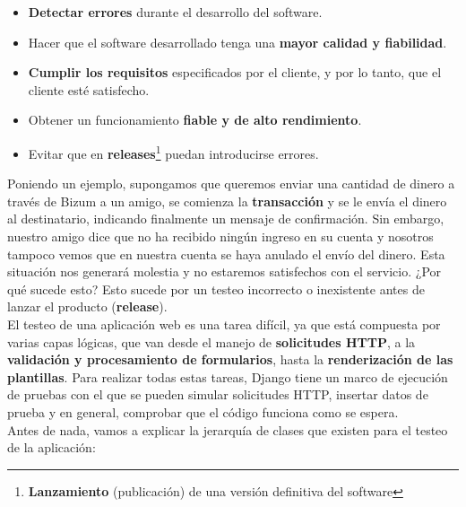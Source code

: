     \begin{itemize}
        \item \textbf{Detectar errores} durante el desarrollo del software.
        \item Hacer que el software desarrollado tenga una \textbf{mayor calidad y
        fiabilidad}.
        \item \textbf{Cumplir los requisitos} especificados por el cliente, y por lo tanto,
        que el cliente esté satisfecho.
        \item Obtener un funcionamiento \textbf{fiable y de alto rendimiento}.
        \item Evitar que en \textbf{releases}\footnote{\textbf{Lanzamiento} (publicación)
        de una versión definitiva del software} puedan introducirse errores.
    \end{itemize}

Poniendo un ejemplo, supongamos que queremos enviar una cantidad de dinero a través de
Bizum a un amigo, se comienza la \textbf{transacción} y se le envía el dinero al
destinatario, indicando finalmente un mensaje de confirmación. Sin embargo, nuestro amigo
dice que no ha recibido ningún ingreso en su cuenta y nosotros tampoco vemos que en nuestra
cuenta se haya anulado el envío del dinero. Esta situación nos generará molestia y no
estaremos satisfechos con el servicio. ¿Por qué sucede esto? Esto sucede por un testeo
incorrecto o inexistente antes de lanzar el producto (\textbf{release}).\\

El testeo de una aplicación web es una tarea difícil, ya que está compuesta por varias
capas lógicas, que van desde el manejo de \textbf{solicitudes HTTP}, a la
\textbf{validación y procesamiento de formularios}, hasta la \textbf{renderización de las
plantillas}. Para realizar todas estas tareas, Django tiene un marco de ejecución de
pruebas con el que se pueden simular solicitudes HTTP, insertar datos de prueba y en
general, comprobar que el código funciona como se espera.\\

Antes de nada, vamos a explicar la jerarquía de clases que existen para el testeo de la
aplicación:

